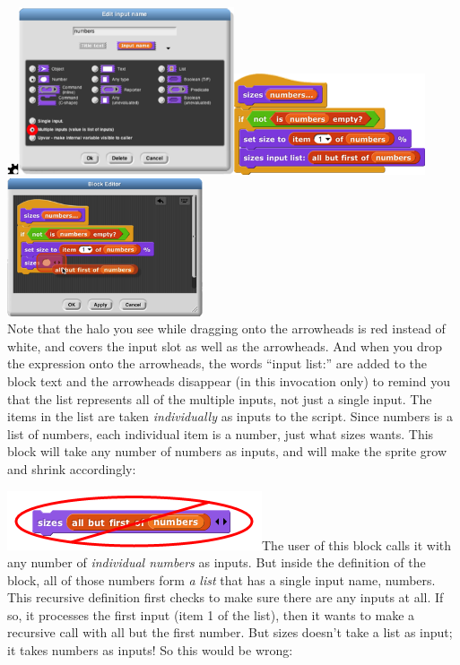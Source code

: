 \includegraphics[width=0.13194in,height=0.13194in]{media/image658.png}\includegraphics[width=2.50139in,height=1.94444in]{media/image713.png}\includegraphics[width=2.225in,height=1.17083in]{media/image714.png}\includegraphics[width=2.27569in,height=1.59722in]{media/image715.png}\\
Note that the halo you see while dragging onto the arrowheads is red
instead of white, and covers the input slot as well as the arrowheads.
And when you drop the expression onto the arrowheads, the words ``input
list:'' are added to the block text and the arrowheads disappear (in
this invocation only) to remind you that the list represents all of the
multiple inputs, not just a single input. The items in the list are
taken \emph{individually} as inputs to the script. Since numbers is a
list of numbers, each individual item is a number, just what sizes
wants. This block will take any number of numbers as inputs, and will
make the sprite grow and shrink accordingly:

\includegraphics[width=2.95833in,height=0.6875in]{media/image722.png}The
user of this block calls it with any number of \emph{individual numbers}
as inputs. But inside the definition of the block, all of those numbers
form \emph{a} \emph{list} that has a single input name, numbers. This
recursive definition ﬁrst checks to make sure there are any inputs at
all. If so, it processes the ﬁrst input (item 1 of the list), then it
wants to make a recursive call with all but the ﬁrst number. But sizes
doesn't take a list as input; it takes numbers as inputs! So this would
be wrong:

